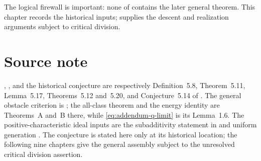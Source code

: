 The logical firewall is important: none of
contains the later general theorem.  This chapter records the historical
inputs; 
supplies the descent and realization arguments subject to critical division.

\section{Source note}

,
, and the historical
conjecture are respectively Definition~5.8, Theorem~5.11, Lemma~5.17,
Theorems~5.12 and~5.20, and Conjecture~5.14 of \cite{BJ22}.  The general
obstacle criterion is \cite[Lemma~1.3]{BJ22b}; the all-class theorem and the
energy identity are Theorems~A and~B there, while
\eqref{eq:addendum-q-limit} is its Lemma~1.6.  The positive-characteristic
ideal inputs are the subadditivity statement in
\cite[\S4, Remark~4.4(3)]{GJKM19} and uniform generation
\cite[Theorem~4.6]{GJKM19}.  The conjecture is stated here only at its
historical location; the following nine chapters give the general assembly
subject to the unresolved critical division assertion.
